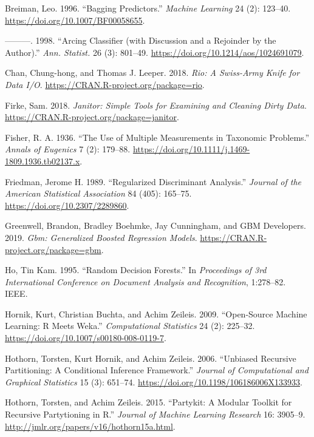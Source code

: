 \documentclass[
]{book}
\theoremstyle{plain}
\theoremstyle{definition}
\theoremstyle{definition}
\theoremstyle{definition}
\theoremstyle{definition}
\theoremstyle{remark}
\begin{document}
\leavevmode\hypertarget{ref-breiman1996}{}%
Breiman, Leo. 1996. ``Bagging Predictors.'' \emph{Machine Learning} 24 (2): 123--40. \url{https://doi.org/10.1007/BF00058655}.

\leavevmode\hypertarget{ref-breiman1998}{}%
---------. 1998. ``Arcing Classifier (with Discussion and a Rejoinder by the Author).'' \emph{Ann. Statist.} 26 (3): 801--49. \url{https://doi.org/10.1214/aos/1024691079}.

\leavevmode\hypertarget{ref-R-rio}{}%
Chan, Chung-hong, and Thomas J. Leeper. 2018. \emph{Rio: A Swiss-Army Knife for Data I/O}. \url{https://CRAN.R-project.org/package=rio}.

\leavevmode\hypertarget{ref-R-janitor}{}%
Firke, Sam. 2018. \emph{Janitor: Simple Tools for Examining and Cleaning Dirty Data}. \url{https://CRAN.R-project.org/package=janitor}.

\leavevmode\hypertarget{ref-fisher1936}{}%
Fisher, R. A. 1936. ``The Use of Multiple Measurements in Taxonomic Problems.'' \emph{Annals of Eugenics} 7 (2): 179--88. \url{https://doi.org/10.1111/j.1469-1809.1936.tb02137.x}.

\leavevmode\hypertarget{ref-friedman1989}{}%
Friedman, Jerome H. 1989. ``Regularized Discriminant Analysis.'' \emph{Journal of the American Statistical Association} 84 (405): 165--75. \url{https://doi.org/10.2307/2289860}.

\leavevmode\hypertarget{ref-R-gbm}{}%
Greenwell, Brandon, Bradley Boehmke, Jay Cunningham, and GBM Developers. 2019. \emph{Gbm: Generalized Boosted Regression Models}. \url{https://CRAN.R-project.org/package=gbm}.

\leavevmode\hypertarget{ref-ho1995}{}%
Ho, Tin Kam. 1995. ``Random Decision Forests.'' In \emph{Proceedings of 3rd International Conference on Document Analysis and Recognition}, 1:278--82. IEEE.

\leavevmode\hypertarget{ref-R-Rweka}{}%
Hornik, Kurt, Christian Buchta, and Achim Zeileis. 2009. ``Open-Source Machine Learning: R Meets Weka.'' \emph{Computational Statistics} 24 (2): 225--32. \url{https://doi.org/10.1007/s00180-008-0119-7}.

\leavevmode\hypertarget{ref-R-party}{}%
Hothorn, Torsten, Kurt Hornik, and Achim Zeileis. 2006. ``Unbiased Recursive Partitioning: A Conditional Inference Framework.'' \emph{Journal of Computational and Graphical Statistics} 15 (3): 651--74. \url{https://doi.org/10.1198/106186006X133933}.

\leavevmode\hypertarget{ref-R-partykit}{}%
Hothorn, Torsten, and Achim Zeileis. 2015. ``Partykit: A Modular Toolkit for Recursive Partytioning in R.'' \emph{Journal of Machine Learning Research} 16: 3905--9. \url{http://jmlr.org/papers/v16/hothorn15a.html}.
\end{document}
